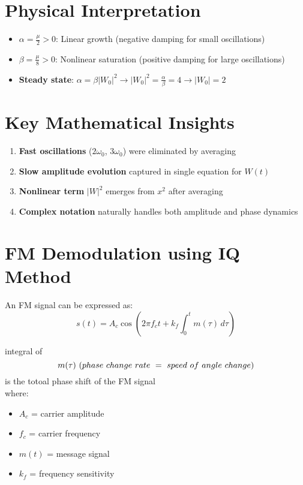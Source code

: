 \documentclass{article}
\begin{document}
\section{Physical Interpretation}

\begin{itemize}
    \item $\alpha = \frac{\mu}{2} > 0$: Linear growth (negative damping for small oscillations)
    \item $\beta = \frac{\mu}{8} > 0$: Nonlinear saturation (positive damping for large oscillations)
    \item \textbf{Steady state}: $\alpha = \beta|W_0|^2 \rightarrow |W_0|^2 = \frac{\alpha}{\beta} = 4 \rightarrow |W_0| = 2$
\end{itemize}

\section{Key Mathematical Insights}

\begin{enumerate}
    \item \textbf{Fast oscillations} ($2\omega_0$, $3\omega_0$) were eliminated by averaging
    \item \textbf{Slow amplitude evolution} captured in single equation for $W(t)$
    \item \textbf{Nonlinear term} $|W|^2$ emerges from $x^2$ after averaging
    \item \textbf{Complex notation} naturally handles both amplitude and phase dynamics
\end{enumerate}
\section*{FM Demodulation using IQ Method}

An FM signal can be expressed as:
\[
s(t) = A_c \cos\left( 2\pi f_c t + k_f \int_{0}^{t} m(\tau) \, d\tau \right)
\]

integral of\[
 m(\tau)\ (phase\ change\ rate\ =\ speed\ of\ angle\ change)\\
\]is the totoal phase shift of the FM signal\\
where:
\begin{itemize}
    \item $A_c$ = carrier amplitude
    \item $f_c$ = carrier frequency
    \item $m(t)$ = message signal
    \item $k_f$ = frequency sensitivity
\end{itemize}
\end{document}
